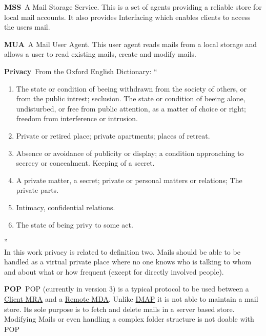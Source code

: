\documentclass[10pt,a4paper,appendixprefix,twocolumn,draft]{scrbook}
\newenvironment{entry}{\par\leavevmode\hangpara{1.5mm}{1}\ignorespaces}{\RaggedRight\par}
\newcommand*{\mainentry}[2]{{\bfseries{#1\label{def:#1}}}~#2\par}
\newcommand*{\defref}[1]{\hyperref[def:#1]{#1}}
\begin{document}
\begin{entry}
  \mainentry{MSS}{A Mail Storage Service. This is a set of agents providing a reliable store for local mail accounts. It also provides Interfacing which enables clients to access the users mail.}
\end{entry}

\begin{entry}
  \mainentry{MUA}{A Mail User Agent. This user agent reads mails from a local storage and allows a user to read existing mails, create and modify mails.}
\end{entry}

\begin{entry}
  \mainentry{Privacy}{From the Oxford English Dictionary: ``
    \begin{enumerate}
      \item The state or condition of beeing withdrawn from the society of others, or from the public intrest; seclusion. The state or condition of beeing alone, undisturbed, or free from public attention, as a matter of choice or right; freedom from interference or intrusion.
      \item Private or retired place; private apartments; places of retreat.
      \item Absence or avoidance of publicity or display; a condition approaching to secrecy or concealment. Keeping of a secret.
      \item A private matter, a secret; private or personal matters or relations; The private parts.
      \item Intimacy, confidential relations.
      \item The state of being privy to some act.
    \end{enumerate}''\cite[FIXME]{OXFORD}\\
    In this work privacy is related to definition two. Mails should be able to be handled as a virtual private place where no one knows who is talking to whom and about what or how frequent (except for directly involved people).
  }
\end{entry}

\begin{entry}
  \mainentry{POP}{POP (currently in version 3) is a typical protocol to be used between a \defref{Client MRA} and a \defref{Remote MDA}. Unlike \defref{IMAP} it is not able to maintain a mail store. Its sole purpose is to fetch and delete mails in a server based store. Modifying Mails or even handling a complex folder structure is not doable with POP}
\end{entry}
\end{document}
